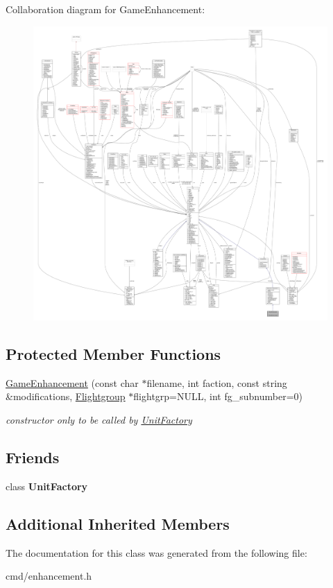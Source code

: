 Collaboration diagram for Game\+Enhancement\+:
\nopagebreak
\begin{figure}[H]
\begin{center}
\leavevmode
\includegraphics[width=350pt]{d6/d32/classGameEnhancement__coll__graph}
\end{center}
\end{figure}
\subsection*{Protected Member Functions}
\begin{DoxyCompactItemize}
\item 
\hyperlink{classGameEnhancement_a31bb2247919af18ca791b6f1c3d2c634}{Game\+Enhancement} (const char $\ast$filename, int faction, const string \&modifications, \hyperlink{classFlightgroup}{Flightgroup} $\ast$flightgrp=N\+U\+LL, int fg\+\_\+subnumber=0)\hypertarget{classGameEnhancement_a31bb2247919af18ca791b6f1c3d2c634}{}\label{classGameEnhancement_a31bb2247919af18ca791b6f1c3d2c634}

\begin{DoxyCompactList}\small\item\em constructor only to be called by \hyperlink{classUnitFactory}{Unit\+Factory} \end{DoxyCompactList}\end{DoxyCompactItemize}
\subsection*{Friends}
\begin{DoxyCompactItemize}
\item 
class {\bfseries Unit\+Factory}\hypertarget{classGameEnhancement_a187c66d2d867f6265d3b0c99ffc34838}{}\label{classGameEnhancement_a187c66d2d867f6265d3b0c99ffc34838}

\end{DoxyCompactItemize}
\subsection*{Additional Inherited Members}


The documentation for this class was generated from the following file\+:\begin{DoxyCompactItemize}
\item 
cmd/enhancement.\+h\end{DoxyCompactItemize}
